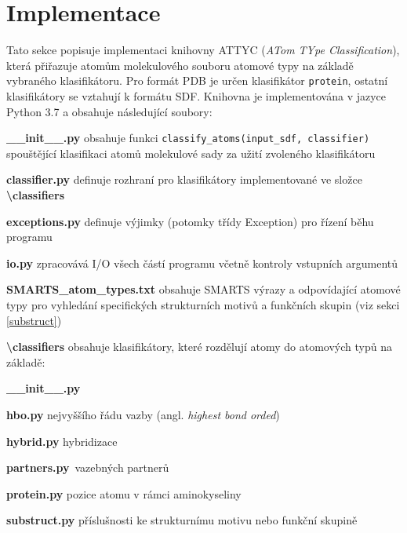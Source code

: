\chapter{Implementace}
Tato sekce popisuje implementaci knihovny ATTYC (\textit{ATom TYpe Classification}), která přiřazuje atomům molekulového souboru atomové typy na základě vybraného  klasifikátoru. Pro formát PDB je určen klasifikátor \verb|protein|, ostatní klasifikátory se vztahují k formátu  SDF. Knihovna je implementována v jazyce Python 3.7 a obsahuje následující soubory:

\vspace{0.7cm}
\noindent {} \textbf{\_\_init\_\_.py} obsahuje funkci \verb|classify_atoms(input_sdf, classifier)| spouštějící klasifikaci atomů molekulové sady za užití zvoleného klasifikátoru

\medskip
\noindent \textbf{classifier.py} definuje rozhraní pro klasifikátory implementované ve složce \textbf{\textbackslash classifiers}

\medskip
\noindent \textbf{exceptions.py} definuje výjimky (potomky třídy Exception) pro řízení běhu programu

\medskip
\noindent {}\textbf{io.py} zpracovává I/O všech částí programu včetně kontroly vstupních argumentů 

\medskip
\noindent {}\textbf{SMARTS\_atom\_types.txt} obsahuje SMARTS výrazy a odpovídající atomové typy pro vyhledání specifických strukturních motivů a funkčních skupin (viz sekci \ref{substruct})

\medskip
\noindent\textbf{\textbackslash classifiers} obsahuje klasifikátory, které rozdělují atomy do atomových typů na základě:

\medskip
\textbf{\_\_init\_\_.py}

\medskip
\textbf{hbo.py} nejvyššího řádu vazby (angl. \textit{highest bond orded})

\medskip
\textbf{hybrid.py} hybridizace

\medskip
\textbf{partners.py}\ vazebných partnerů

\medskip
\textbf{protein.py} pozice atomu v rámci aminokyseliny

\medskip
\textbf{substruct.py} příslušnosti ke strukturnímu motivu nebo funkční skupině



